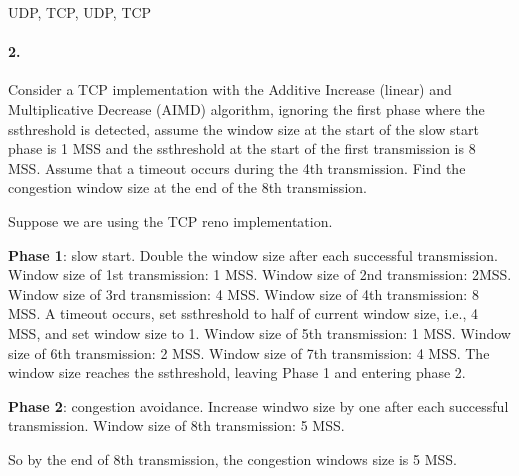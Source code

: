 \documentclass{article}
\begin{document}
UDP, TCP, UDP, TCP

\paragraph{2.} Consider a TCP implementation with the Additive Increase (linear) and Multiplicative Decrease (AIMD) algorithm, ignoring the ﬁrst phase where the ssthreshold is detected, assume the window size at the start of the slow start phase is 1 MSS and the ssthreshold at the start of the ﬁrst transmission is 8 MSS. Assume that a timeout occurs during the 4th transmission. Find the congestion window size at the end of the 8th transmission.

Suppose we are using the TCP reno implementation.

\textbf{Phase 1}: slow start. Double the window size after each successful transmission. Window size of 1st transmission: 1 MSS. Window size of 2nd transmission: 2MSS. Window size of 3rd transmission: 4 MSS. Window size of 4th transmission: 8 MSS. A timeout occurs, set ssthreshold to half of current window size, i.e., 4 MSS, and set window size to 1. Window size of 5th transmission: 1 MSS. Window size of 6th transmission: 2 MSS. Window size of 7th transmission: 4 MSS. The window size reaches the ssthreshold, leaving Phase 1 and entering phase 2.

\textbf{Phase 2}: congestion avoidance. Increase windwo size by one after each successful transmission. Window size of 8th transmission: 5 MSS.

So by the end of 8th transmission, the congestion windows size is 5 MSS.
\end{document}
